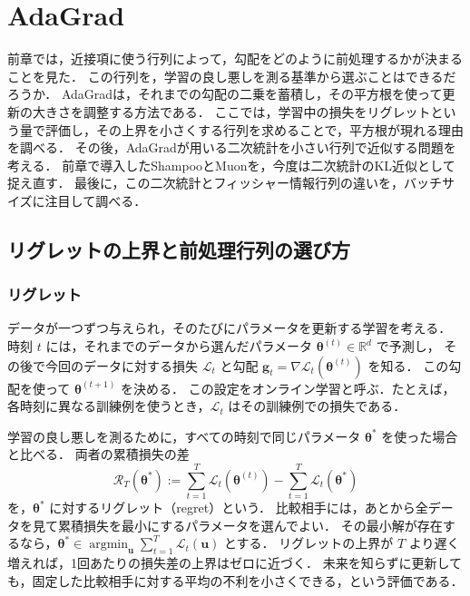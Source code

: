 \documentclass[../main.tex]{subfiles}
\begin{document}
\ifSubfilesClassLoaded{\setcounter{chapter}{2}}{}

\chapter{AdaGrad}

前章では，近接項に使う行列によって，勾配をどのように前処理するかが決まることを見た．
この行列を，学習の良し悪しを測る基準から選ぶことはできるだろうか．
AdaGradは，それまでの勾配の二乗を蓄積し，その平方根を使って更新の大きさを調整する方法である．
ここでは，学習中の損失をリグレットという量で評価し，その上界を小さくする行列を求めることで，平方根が現れる理由を調べる\cite{duchi2011adagrad}．
その後，AdaGradが用いる二次統計を小さい行列で近似する問題を考える．
前章で導入したShampooとMuonを，今度は二次統計のKL近似として捉え直す．
最後に，この二次統計とフィッシャー情報行列の違いを，バッチサイズに注目して調べる．

\section{リグレットの上界と前処理行列の選び方}

\subsection{リグレット}

データが一つずつ与えられ，そのたびにパラメータを更新する学習を考える．
時刻 $t$ には，それまでのデータから選んだパラメータ $\bm{\theta}^{(t)}\in\mathbb{R}^d$ で予測し，
その後で今回のデータに対する損失 $\mathcal{L}_t$ と勾配
$\bm{g}_t=\nabla\mathcal{L}_t(\bm{\theta}^{(t)})$ を知る．
この勾配を使って $\bm{\theta}^{(t+1)}$ を決める．
この設定をオンライン学習と呼ぶ．たとえば，各時刻に異なる訓練例を使うとき，$\mathcal{L}_t$ はその訓練例での損失である．

学習の良し悪しを測るために，すべての時刻で同じパラメータ $\bm{\theta}^*$ を使った場合と比べる．
両者の累積損失の差
\begin{equation}
  \mathcal{R}_T(\bm{\theta}^*)
  :=\sum_{t=1}^T\mathcal{L}_t(\bm{\theta}^{(t)})
  -\sum_{t=1}^T\mathcal{L}_t(\bm{\theta}^*)
  \label{eq:adagrad-regret}
\end{equation}
を，$\bm{\theta}^*$ に対するリグレット（regret）という．
比較相手には，あとから全データを見て累積損失を最小にするパラメータを選んでよい．
その最小解が存在するなら，$\bm{\theta}^*\in\operatorname{argmin}_{\bm{u}}\sum_{t=1}^T\mathcal{L}_t(\bm{u})$ とする．
リグレットの上界が $T$ より遅く増えれば，1回あたりの損失差の上界はゼロに近づく．
未来を知らずに更新しても，固定した比較相手に対する平均の不利を小さくできる，という評価である．
\end{document}
